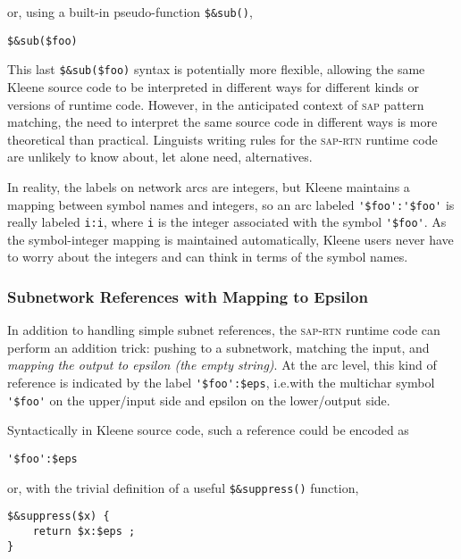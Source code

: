 \documentclass[letterpaper,12pt]{article}
\providecommand{\acro}{}\renewcommand{\acro}{\textsc}
\begin{document}
\noindent
or, using a built-in pseudo-function \verb!$&sub()!,

\begin{Verbatim}[fontsize=\small]
$&sub($foo)
\end{Verbatim}

This last \verb!$&sub($foo)! syntax is potentially more flexible, allowing the same
Kleene source code to be interpreted in different ways for different kinds or versions of
runtime code.  However, in the anticipated context of \acro{sap} pattern matching, the need to interpret the same source code in different ways
is more theoretical than practical.  Linguists writing rules for the \acro{sap-rtn}
runtime code are unlikely to know about, let alone need, alternatives.

In reality, the labels on network arcs are integers, but Kleene maintains a mapping
between symbol names and integers, so an arc labeled \verb!'$foo':'$foo'! is really
labeled \verb!i:i!, where \verb!i! is the integer associated with the symbol
\verb!'$foo'!.  As the symbol-integer mapping is maintained automatically, Kleene
users never have to worry about the integers and can think in terms of the symbol
names.

\subsubsection{Subnetwork References with Mapping to Epsilon}

In addition to handling simple subnet references, the \acro{sap-rtn} runtime code can
perform an addition trick: pushing to a subnetwork, matching the input, and
\emph{mapping the output to epsilon (the empty string)}.  At the arc level, this kind
of reference is indicated by the label \verb!'$foo':$eps!, i.e.\@ with the multichar
symbol \verb!'$foo'! on the upper/input side and epsilon on the lower/output side.

Syntactically in Kleene source code, such a reference could be encoded as

\begin{Verbatim}[fontsize=\small]
'$foo':$eps
\end{Verbatim}

\noindent
or, with the trivial definition of a useful \verb!$&suppress()! function,

\begin{Verbatim}[fontsize=\small]
$&suppress($x) {
	return $x:$eps ;
}
\end{Verbatim}
\end{document}
